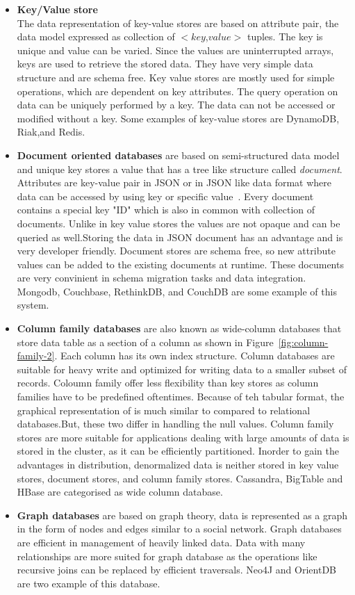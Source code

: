 	\begin{itemize}
		\item 
			\textbf{Key/Value store}\\ The data representation of key-value stores are based on attribute pair, the data model expressed as collection of $<$$key$,$value$$>$ tuples. The key is unique and value can be varied. Since the values are uninterrupted arrays, keys are used to retrieve the stored data. They have very simple data structure and are schema free. Key value stores are mostly used for simple operations, which are dependent on key attributes. The query operation on data can be uniquely performed by a key. The data can not be accessed or modified without a key. Some examples of key-value stores are DynamoDB, Riak,and Redis.
		\item 
			\textbf{Document oriented databases} are based on semi-structured data model and unique key stores a value that has a tree like structure called \textit{document}. Attributes are key-value pair in JSON or in JSON like data format where data can be accessed by using key or specific value~\citep{hecht2011nosql}. Every document contains a special key "ID" which is also in common with collection of documents. Unlike in key value stores the values are not opaque and can be queried as well.Storing the data in JSON document has an advantage and is very developer friendly. Document stores are schema free, so new attribute values can be added to the existing documents at runtime. These documents are very convinient in schema migration tasks and data integration.  Mongodb, Couchbase, RethinkDB, and CouchDB are some example of this system.
		\item 
			\textbf{Column family databases} are also known as wide-column databases that store data table as a section of a column as shown in Figure~\ref{fig:column-family-2}. Each column has its own index structure.
			 Column databases are suitable for heavy write and optimized for writing data to a smaller subset of records. Coloumn family offer less flexibility than key stores as column families have to be predefined oftentimes. Because of teh tabular format, the graphical representation of is much similar to compared to relational databases.But, these two differ in handling the null values. Column family stores are more suitable for applications dealing with large amounts of data is stored in the cluster, as it can be efficiently partitioned. Inorder to gain the advantages in distribution, denormalized data is neither stored in key value stores, document stores, and column family stores.  Cassandra, BigTable and HBase are categorised as wide column database.
		\item 
			\textbf{Graph databases} are based on graph theory, data  is represented as a graph in the form of nodes and edges similar to a social network. Graph databases are efficient in management of heavily linked data. Data with many relationships are more suited for graph database as the operations like recursive joins can be replaced by efficient traversals. Neo4J and OrientDB are two example of this database.
	\end{itemize}
